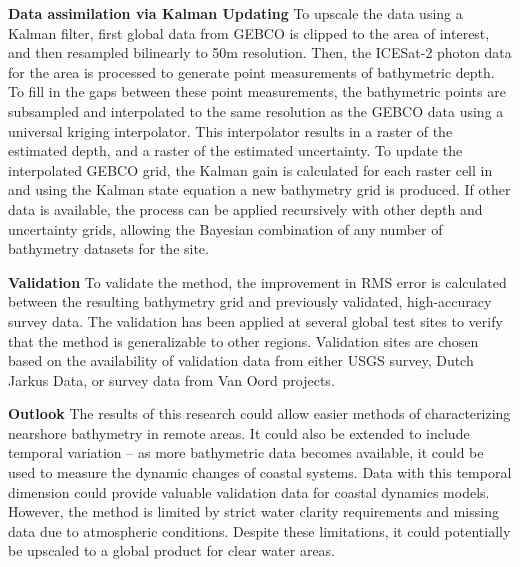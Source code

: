 \noindent\textbf{Data assimilation via Kalman Updating} To upscale the data using a Kalman filter, first global data from GEBCO is clipped to the area of interest, and then resampled bilinearly to 50m resolution. Then, the ICESat-2 photon data for the area is processed to generate point measurements of bathymetric depth. To fill in the gaps between these point measurements, the bathymetric points are subsampled and interpolated to the same resolution as the GEBCO data using a universal kriging interpolator. This interpolator results in a raster of the estimated depth, and a raster of the estimated uncertainty. To update the interpolated GEBCO grid, the Kalman gain is calculated for each raster cell in and using the Kalman state equation a new bathymetry grid is produced. If other data is available, the process can be applied recursively with other depth and uncertainty grids, allowing the Bayesian combination of any number of bathymetry datasets for the site.


\noindent \textbf{Validation} To validate the method, the improvement in RMS error is calculated between the resulting bathymetry grid and previously validated, high-accuracy survey data. The validation has been applied at several global test sites to verify that the method is generalizable to other regions. Validation sites are chosen based on the availability of validation data from either USGS survey, Dutch Jarkus Data, or survey data from Van Oord projects. 


\noindent\textbf{Outlook} The results of this research could allow easier methods of characterizing nearshore bathymetry in remote areas. It could also be extended to include temporal variation – as more bathymetric data becomes available, it could be used to measure the dynamic changes of coastal systems. Data with this temporal dimension could provide valuable validation data for coastal dynamics models. However, the method is limited by strict water clarity requirements and missing data due to atmospheric conditions. Despite these limitations, it could potentially be upscaled to a global product for clear water areas. 
